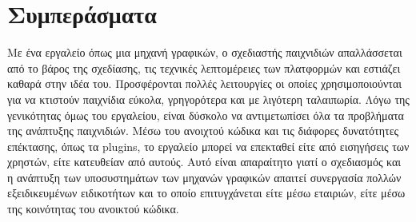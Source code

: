 \section{Συμπεράσματα}
Με ένα εργαλείο όπως μια μηχανή γραφικών, ο σχεδιαστής παιχνιδιών απαλλάσσεται από το βάρος της σχεδίασης, τις τεχνικές λεπτομέρειες των πλατφορμών και εστιάζει καθαρά στην ιδέα του. Προσφέρονται πολλές λειτουργίες οι οποίες χρησιμοποιούνται για να κτιστούν παιχνίδια εύκολα, γρηγορότερα και με λιγότερη ταλαιπωρία. Λόγω της γενικότητας όμως του εργαλείου, είναι δύσκολο να αντιμετωπίσει όλα τα προβλήματα της ανάπτυξης παιχνιδιών. Μέσω του ανοιχτού κώδικα και τις διάφορες δυνατότητες επέκτασης, όπως τα plugins, το εργαλείο μπορεί να επεκταθεί είτε από εισηγήσεις των χρηστών, είτε κατευθείαν από αυτούς. Αυτό είναι απαραίτητο γιατί ο σχεδιασμός και η ανάπτυξη των υποσυστημάτων των μηχανών γραφικών απαιτεί συνεργασία πολλών εξειδικευμένων ειδικοτήτων και το οποίο επιτυγχάνεται είτε μέσω εταιριών, είτε μέσω της κοινότητας του ανοικτού κώδικα.
